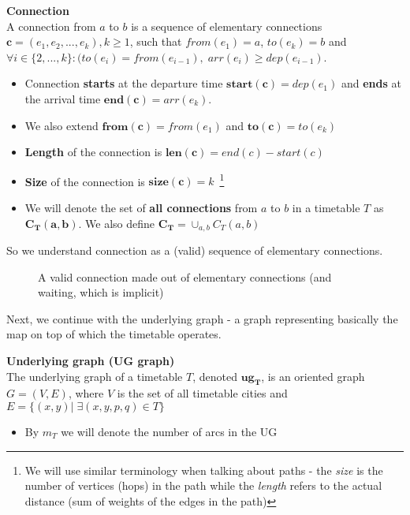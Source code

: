    	\begin{definition}
        \textbf{Connection} \\
        A connection from $a$ to $b$ is a sequence of elementary connections $\bm{c} = (e_{1}, e_{2}, ..., e_{k}), k \geq 1$, such that $from(e_{1}) = a$, $to(e_{k}) = b$ and $\forall i \in \{2, ..., k\}: (to(e_{i}) = from(e_{i - 1}), \; arr(e_{i}) \geq dep(e_{i - 1})$.
        \begin{itemize}
			\item Connection \textbf{starts} at the departure time $\bm{start(c)} = dep(e_{1})$ and \textbf{ends} at the arrival time $\bm{end(c)} = arr(e_{k})$.
			\item We also extend $\bm{from(c)} = from(e_{1})$ and $\bm{to(c)} = to(e_{k})$
	        \item \textbf{Length} of the connection is $\bm{len(c)} = end(c) - start(c)$
	        \item \textbf{Size} of the connection is $\bm{size(c)} = k$~\footnote{We will use similar terminology when talking about paths - the \textit{size} is the number of vertices (hops) in the path while the \textit{length} refers to the actual distance (sum of weights of the edges in the path)}
	        \item We will denote the set of \textbf{all connections} from $a$ to $b$ in a timetable $T$ as $\bm{C_{T}(a, b)}$. We also define $\bm{C_{T}} = \cup_{a, b} C_{T}(a, b)$
        \end{itemize}
    \end{definition}
    
    \noindent So we understand connection as a (valid) sequence of elementary connections. 
    
    \begin{figure}[h!]
        \begin{center}
        \end{center}
		\caption{\label{pic:conn} A valid connection made out of \textcolor{elcon-clr}{elementary connections} (and \textcolor{waiting-clr}{waiting}, which is implicit)}
	\end{figure}
	
	\noindent Next, we continue with the underlying graph - a graph representing basically the map on top of which the timetable operates.
	
	\begin{definition}
        \textbf{Underlying graph (UG graph)} \\
        The underlying graph of a timetable $T$, denoted $\bm{ug_{T}}$, is an oriented graph $G = (V, E)$, where $V$ is the set of all timetable cities and $E = \{(x, y)|\; \exists (x, y, p, q) \in T\}$
        \begin{itemize}
        	\item By $m_{T}$ we will denote the number of arcs in the UG
        \end{itemize}
    \end{definition}
    
